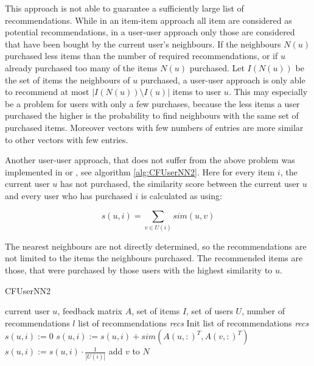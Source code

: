 \documentclass[10pt]{reportMaster}
\begin{document}
This approach is not able to guarantee a sufficiently large list of recommendations.
While in an item-item approach all item are considered as potential recommendations, in a user-user approach only those are considered that have been bought by the current user's neighbours.
If the neighbours $N(u)$ purchased less items than the number of required recommendations, or if $u$ already purchased too many of the items $N(u)$ purchased.
Let $I(N(u))$ be the set of items the neighbours of $u$ purchased, a user-user approach is only able to recommend at most $|I(N(u)) \setminus I(u)|$ items to user $u$.
This may especially be a problem for users with only a few purchases, because the less items a user purchased the higher is the probability to find neighbours with the same set of purchased items.
Moreover vectors with few numbers of entries are more similar to other vectors with few entries.

Another user-user approach, that does not suffer from the above problem was implemented in \cite{efficientTopN} or \cite{effectiveLatentModels}, see algorithm \ref{alg:CFUserNN2}.
Here for every item $i$, the current user $u$ has not purchased, the similarity score between the current user $u$ and every user who has purchased $i$ is calculated as using: 

\begin{equation}
	s(u,i) = \sum_{v \in U(i)}{sim(u,v)}
\end{equation}

The nearest neighbours are not directly determined, so the recommendations are not limited to the items the neighbours purchased.
The recommended items are those, that were purchased by those users with the highest similarity to $u$.

\begin{algorithm}
	\caption[CFUserNN2]{CFUserNN2}
	\label{alg:CFUserNN2}
	\begin{algorithmic}[1]
		\Require current user $u$, feedback matrix $A$, set of items $I$, set of users $U$, number of recommendations $l$
		\Ensure list of recommendations \textit{recs}
		\State Init list of recommendations \textit{recs}
			\State $s(u,i) := 0$
				\State $s(u,i) := s(u,i) + sim(A(u,:)^T, A(v,:)^T)$
			\EndFor
			\State $s(u,i) := s(u,i) \cdot \frac{1}{|U(i)|}$
				\State add $v$ to $N$
			\EndIf
		\EndFor
	\end{algorithmic}	
\end{algorithm}
\end{document}
